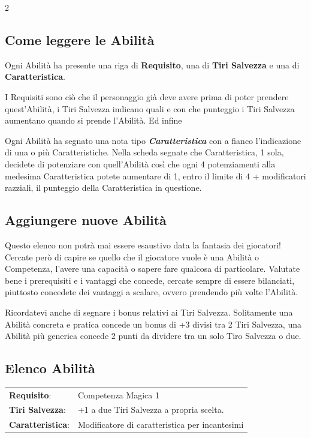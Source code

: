 \begin{multicols}{2}
\subsection{Come leggere le Abilità}\label{tirisalvezzaedabilita}\label{caratteristicheedabilita}

Ogni Abilità ha presente una riga di \textbf{Requisito}, una di \textbf{Tiri Salvezza} e una di \textbf{Caratteristica}.

I Requisiti sono ciò che il personaggio già deve avere prima di poter prendere quest'Abilità, i Tiri Salvezza indicano quali e con che punteggio i Tiri Salvezza aumentano quando si prende l'Abilità. Ed infine

Ogni Abilità ha segnato una nota tipo \emph{\textbf{Caratteristica}} con a fianco l'indicazione di una o più Caratteristiche. Nella scheda segnate che Caratteristica, 1 sola, decidete di potenziare con quell'Abilità così che ogni 4 potenziamenti alla medesima Caratteristica potete aumentare di 1, entro il limite di 4 + modificatori razziali, il punteggio della Caratteristica in questione.

\subsection{Aggiungere nuove Abilità}\label{aggiungereabilita}

Questo elenco non potrà mai essere esaustivo data la fantasia dei giocatori! Cercate però di capire se quello che il giocatore vuole è una Abilità o Competenza, l'avere una capacità o sapere fare qualcosa di particolare.
Valutate bene i prerequisiti e i vantaggi che concede, cercate sempre di essere bilanciati, piuttosto concedete dei vantaggi a scalare, ovvero prendendo più volte l'Abilità.

Ricordatevi anche di segnare i bonus relativi ai Tiri Salvezza. Solitamente una Abilità concreta e pratica concede un bonus di +3 divisi tra 2 Tiri Salvezza, una Abilità più generica concede 2 punti da dividere tra un solo Tiro Salvezza o due.

\subsection{Elenco Abilità}

\hspace{-0.2cm}\begin{tabularx}{\linewidth}{l@{\hspace{8pt}}X}
\rowcolor{gray!20}\textbf{Requisito}: & Competenza Magica 1\\
\textbf{Tiri Salvezza}: & +1 a due Tiri Salvezza a propria scelta.\\
\rowcolor{gray!20}\textbf{Caratteristica}: & Modificatore di caratteristica per incantesimi\\
\end{tabularx}\smallskip


\end{multicols}
